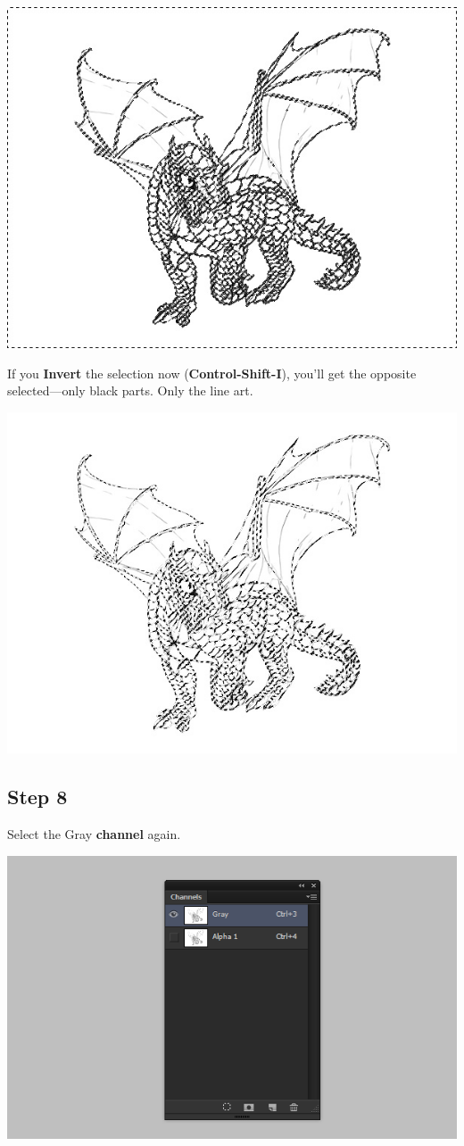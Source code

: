 \begin{center}
\includegraphics[width=0.7\linewidth]{Photos/quick-lineart-select-white}
\end{center}

If you \textbf{Invert} the selection now (\textbf{Control-Shift-I}), you'll get the opposite selected—only black parts. Only the line art.

\begin{center}
\includegraphics[width=0.7\linewidth]{Photos/quick-lineart-select-invert}
\end{center}

\subsection{Step 8}
Select the Gray \textbf{channel} again.

\begin{center}
\includegraphics[width=0.7\linewidth]{Photos/quick-lineart-back}
\end{center}

